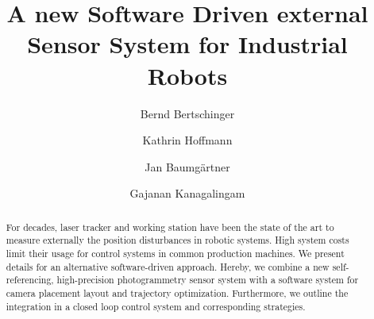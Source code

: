 \documentclass[5p,times,procedia]{elsarticle}
\begin{document}
\begin{frontmatter}



%

\title{A new Software Driven external Sensor System for Industrial Robots}


\author[a]{Bernd Bertschinger\corref{*}}
\author[b]{Kathrin Hoffmann}
\author[c]{Jan Baumgärtner}
\author[b]{Gajanan Kanagalingam}

\address[a]{Institute of Applied Optics, University of Stuttgart - ITO, Pfaffenwaldring 9, 70569 Stuttgart, Germany}
\address[b]{Institute for System Dynamics, University of Stuttgart - ISYS, Waldburgstr. 17/19, 70563 Stuttgart, Germany}
\address[c]{Institute of Production Science, Karlsruhe Institute of Technology - WBK, Kaiserstraße 12, 76131 Karlsruhe, Germany}


\begin{abstract}
For decades, laser tracker and working station have been the state of the art to measure externally the position disturbances in robotic systems. High system costs limit their usage for control systems in common production machines. We present details for an alternative software-driven approach. Hereby, we combine a new self-referencing, high-precision photogrammetry sensor system with a software system for camera placement layout and trajectory optimization. Furthermore, we outline the integration in a closed loop control system and corresponding strategies.
\end{abstract}


\end{frontmatter}
\end{document}
